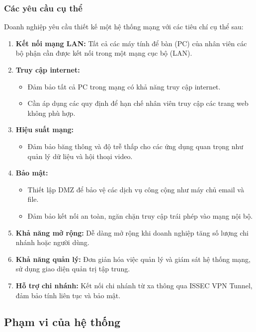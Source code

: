 \documentclass[13pt]{article}
\begin{document}
\subsubsection{Các yêu cầu cụ thể}
Doanh nghiệp yêu cầu thiết kế một hệ thống mạng với các tiêu chí cụ thể sau:
\begin{enumerate}
    \item \textbf{Kết nối mạng LAN: }Tất cả các máy tính để bàn (PC) của nhân viên các bộ phận cần được kết nối trong một mạng cục bộ (LAN).

    \item \textbf{Truy cập internet:}
    \begin{itemize}
        \item Đảm bảo tất cả PC trong mạng có khả năng truy cập internet.
        \item Cần áp dụng các quy định để hạn chế nhân viên truy cập các trang web không phù hợp.
    \end{itemize}


    \item \textbf{Hiệu suất mạng: }
    \begin{itemize}
        \item Đảm bảo băng thông và độ trễ thấp cho các ứng dụng quan trọng như quản lý dữ liệu và hội thoại video.
    \end{itemize}

    \item \textbf{Bảo mật:}
    \begin{itemize}
        \item Thiết lập DMZ để bảo vệ các dịch vụ công cộng như máy chủ email và file.
        \item Đảm bảo kết nối an toàn, ngăn chặn truy cập trái phép vào mạng nội bộ.
    \end{itemize}

    \item \textbf{Khả năng mở rộng: }Dễ dàng mở rộng khi doanh nghiệp tăng số lượng chi nhánh hoặc người dùng.

    \item \textbf{Khả năng quản lý: }Đơn giản hóa việc quản lý và giám sát hệ thống mạng, sử dụng giao diện quản trị tập trung.

    \item \textbf{Hỗ trợ chi nhánh: }Kết nối chi nhánh từ xa thông qua ISSEC VPN Tunnel, đảm bảo tính liên tục và bảo mật.
\end{enumerate}

\subsection{Phạm vi của hệ thống}
\end{document}
